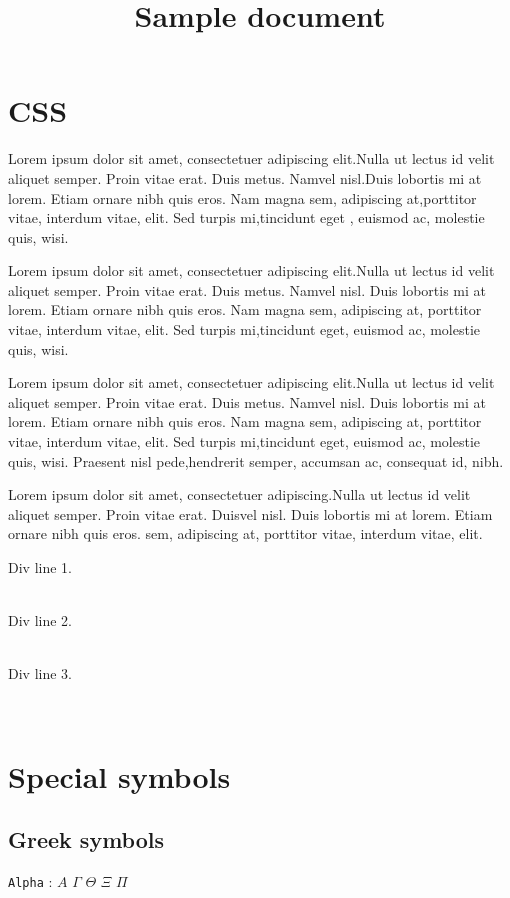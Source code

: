 \documentclass{article}
\title{Sample document}
\newcommand{\Alpha}{A}
\begin{document}
\maketitle
 \section*{CSS} \par Lorem ipsum dolor sit amet, consectetuer adipiscing elit.Nulla ut lectus id velit aliquet semper. Proin vitae erat. Duis metus. Namvel nisl.Duis lobortis mi at lorem. Etiam ornare nibh quis eros. Nam magna sem, adipiscing at,porttitor vitae, interdum vitae, elit. Sed turpis mi,tincidunt eget , euismod ac, molestie quis, wisi.
\par Lorem ipsum dolor sit amet, consectetuer adipiscing elit.Nulla ut lectus id velit aliquet semper. Proin vitae erat. Duis metus. Namvel nisl. Duis lobortis mi at lorem. Etiam ornare nibh quis eros. Nam magna sem, adipiscing at, porttitor vitae, interdum vitae, elit. Sed turpis mi,tincidunt eget, euismod ac, molestie quis, wisi.
\par Lorem ipsum dolor sit amet, consectetuer adipiscing elit.Nulla ut lectus id velit aliquet semper. Proin vitae erat. Duis metus. Namvel nisl. Duis lobortis mi at lorem. Etiam ornare nibh quis eros. Nam magna sem, adipiscing at, porttitor vitae, interdum vitae, elit. Sed turpis mi,tincidunt eget, euismod ac, molestie quis, wisi. Praesent nisl pede,hendrerit semper, accumsan ac, consequat id, nibh.
\par Lorem ipsum dolor sit amet, consectetuer adipiscing.Nulla ut lectus id velit aliquet semper. Proin vitae erat. Duisvel nisl. Duis lobortis mi at lorem. Etiam ornare nibh quis eros. sem, adipiscing at, porttitor vitae, interdum vitae, elit.
 \\ \par Div line 1. 
 \\ 
 \\ \par Div line 2. 
 \\ 
 \\ \par Div line 3.
 \\ 
 \\ 
  \section*{Special symbols}  \subsection*{Greek symbols} \par  \texttt{Alpha}
: $\Alpha$ $\Gamma$ $\Theta$ $\Xi$ $\Pi$ 
\end{document}
